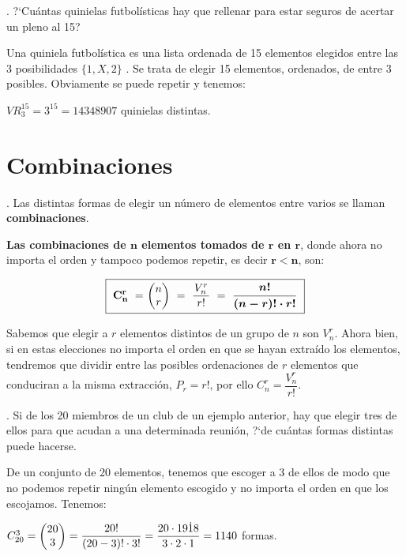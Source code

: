 \begin{example}
	. ?`Cuántas quinielas futbolísticas hay que rellenar para estar seguros de acertar un pleno al 15?
	
	\vspace{4mm} Una quiniela futbolística es una lista ordenada de 15 elementos elegidos entre las 3 posibilidades $\{1,X,2\}$	. Se trata de elegir 15 elementos, ordenados, de entre 3 posibles. Obviamente se puede repetir y tenemos:
	
	\vspace{2mm}$VR_{3}^{15}=3^{15}=14348907$ quinielas distintas.
\end{example}



\section{Combinaciones}

\begin{definition}
	. Las distintas formas de elegir un número de elementos entre varios se llaman \textbf{combinaciones}.
	
	\textbf{Las combinaciones de $\boldsymbol{n}$ elementos tomados de $\boldsymbol{r}$ en $\boldsymbol{r}$}, donde ahora no importa el orden y tampoco podemos repetir, es decir $\boldsymbol{r<n}$, son:
	
	$$\boxed{\  \bold{ C_n^r \ = }\ \mqty(n \\ r) \ = \ 	\dfrac{V_n^r}{\ r! \ } \ = \ \boldsymbol{ \dfrac {n!}{(n-r)!\cdot r!}} \ }$$
\end{definition}


Sabemos que elegir a $r$ elementos distintos de un grupo de $n$ son $V_n^r$. Ahora bien, si en estas elecciones no importa el orden en que se hayan extraído los elementos, tendremos que dividir entre las posibles ordenaciones de $r$ elementos que conduciran a la misma extracción, $P_r=r!$, por ello $C_n^r  = 	\dfrac{V_n^r}{ r!  }$.


\begin{example}
	. Si de los 20 miembros de un club de un ejemplo anterior, hay que elegir tres de ellos para que acudan a una determinada reunión, ?`de cuántas formas distintas puede hacerse.
	
	\vspace{4mm} De un conjunto de 20 elementos, tenemos que escoger a 3 de ellos de modo que no podemos repetir ningún elemento escogido y no importa el orden en que los escojamos. Tenemos: 
	
	\vspace{2mm} $C_{20}^3=\mqty(20\\3)=\dfrac {20!}{(20-3)!\cdot 3!}=\dfrac{20\cdot 19\dot 18}{3\cdot 2 \cdot 1}=1140$ formas.
\end{example}

